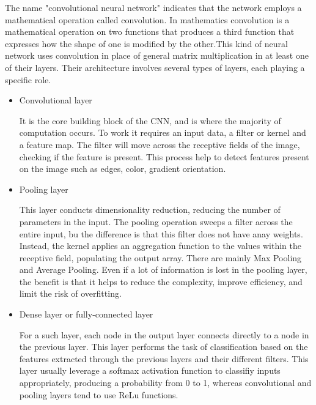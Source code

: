 \documentclass[a4paper, 12pt]{report}
\begin{document}
\begin{itemize}
    The name "convolutional neural network" indicates that the network employs a mathematical operation called convolution. In mathematics convolution is a mathematical operation on two functions that produces a third function that expresses how the shape of one is modified by the other.This kind of neural network uses convolution in place of general matrix multiplication in at least one of their layers. Their architecture involves several types of layers, each playing a specific role. 

    \begin{itemize}

        \item Convolutional layer

    It is the core building block of the CNN, and is where the majority of computation occurs. To work it requires an input data, a filter or kernel and a feature map. The filter will move across the receptive fields of the image, checking if the feature is present. This process help to detect features present on the image such as edges, color, gradient orientation.

        \item Pooling layer

    This layer conducts dimensionality reduction, reducing the number of parameters in the input. The pooling operation sweeps a filter across the entire input, bu the difference is that this filter does not have anay weights. Instead, the kernel applies an aggregation function to the values within the receptive field, populating the output array. There are mainly Max Pooling and Average Pooling. Even if a lot of information is lost in the pooling layer, the benefit is that it helps to reduce the complexity, improve efficiency, and limit the risk of overfitting.

        \item Dense layer or fully-connected layer

    For a such layer, each node in the output layer connects directly to a node in the previous layer. This layer performs the task of classification based on the features extracted through the previous layers and their different filters. This layer usually leverage a softmax activation function to classifiy inputs appropriately, producing a probability from 0 to 1, whereas convolutional and pooling layers tend to use ReLu functions.

    \end{itemize}

    \begin{center}


\end{center}
\end{itemize}
\end{document}
